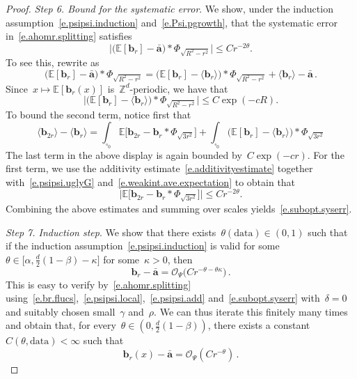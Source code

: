 \documentclass[11pt,twoside]{article} %
\let\oldsquare\square %
\renewcommand{\square}{\oldsquare}
\numberwithin{equation}{section}
\theoremstyle{definition}
\newcommand*{\Z}{\ensuremath{\mathbb{Z}}}
\renewcommand{\b}{\ensuremath{\mathbf{b}}}
\renewcommand{\a}{\mathbf{a}}
\newcommand{\ahom}{\bar{\a}}
\newcommand{\cu}{\square}
\newcommand{\E}{\mathbb{E}}
\renewcommand{\O}{\mathcal{O}}
\newcommand{\data}{\mathrm{data}}
\begin{document}
\begin{proof}
\emph{Step 6. Bound for the systematic error}. We show, under the induction assumption~\eqref{e.psipsi.induction} and~\eqref{e.Psi.pgrowth},  that the systematic error in~\eqref{e.ahomr.splitting} satisfies
\begin{equation}  \label{e.subopt.syserr}
\Big| \bigl( \E [ \b_r ]- \ahom \bigr) \ast \Phi_{\sqrt{R^2-r^2}} \Big| \leq C r^{-2\theta}. 
\end{equation}
To see this, rewrite as
\begin{equation*}  
\bigl( \E [ \b_r ]- \ahom \bigr) \ast \Phi_{\sqrt{R^2-r^2}} 
=
\bigl( \E [ \b_r ] - \langle \b_r \rangle\bigr) \ast \Phi_{\sqrt{R^2-r^2}} 
+ 
\langle \b_r \rangle - \ahom 
\,.
\end{equation*}
Since~$x \mapsto \E [ \b_r(x)]$ is~$\Z^d$-periodic, we have that 
\begin{equation*}  
\Big| \bigl( \E [ \b_r ]- \langle\b_r\rangle \bigr) \ast \Phi_{\sqrt{R^2-r^2}} \Big| \leq C \exp(-c R) .
\end{equation*}
To bound the second term, notice first that 
\begin{equation*}  
\langle \b_{2r} \rangle - \langle \b_r \rangle  
=
\int_{\cu_0} \E\bigl[  \b_{2r}   - \b_r  \ast \Phi_{\sqrt{3 r^2}} \bigr]
+
\int_{\cu_0} \bigl( \E[\b_r]  - \langle \b_r\rangle \bigr) \ast \Phi_{\sqrt{3 r^2}} 
\end{equation*}
The last term in the above display is again bounded by~$C \exp(-cr)$. For the first term, we use the additivity estimate~\eqref{e.additivityestimate} together with~\eqref{e.psipsi.uglyG} and~\eqref{e.weakint.ave.expectation} to obtain that 
\begin{equation*}  
\Big| \E\bigl[  \b_{2r}   - \b_r  \ast \Phi_{\sqrt{3 r^2}} \bigr]\Big| \leq C r^{-2\theta} .
\end{equation*}
Combining the above estimates and summing over scales yields~\eqref{e.subopt.syserr}. 

\smallskip 

\emph{Step 7. Induction step}. 
We show that there exists~$\theta(\data) \in (0,1)$ such that if the induction assumption~\eqref{e.psipsi.induction} is valid for some~$\theta \in \bigl[ \alpha, \frac{d}{2}(1-\beta) - \kappa \bigr]$ for some~$\kappa > 0$, then 
\begin{equation} \label{e.psipsi.buckling}
\b_r - \ahom 
=  
\O_{\Psi} 
\bigl(
C r^{- \theta - \theta \kappa} 
\bigr)
\,.
\end{equation}
This is easy to verify by~\eqref{e.ahomr.splitting} using~\eqref{e.br.flucs},~\eqref{e.psipsi.local},~\eqref{e.psipsi.add} and~\eqref{e.subopt.syserr} with~$\delta = 0$ and suitably chosen small~$\gamma$ and~$\rho$.  We can thus iterate this finitely many times and obtain that, for every~$\theta \in (0,\frac d2(1-\beta))$, there exists a constant~$C(\theta,\data)<\infty$ such that 
\begin{equation} \label{e.psipsi.nearlythere}
\b_r(x) - \ahom  = \O_{\Psi} ( C r^{-\theta} ) \,.
\end{equation} 


\end{proof}
\end{document}
